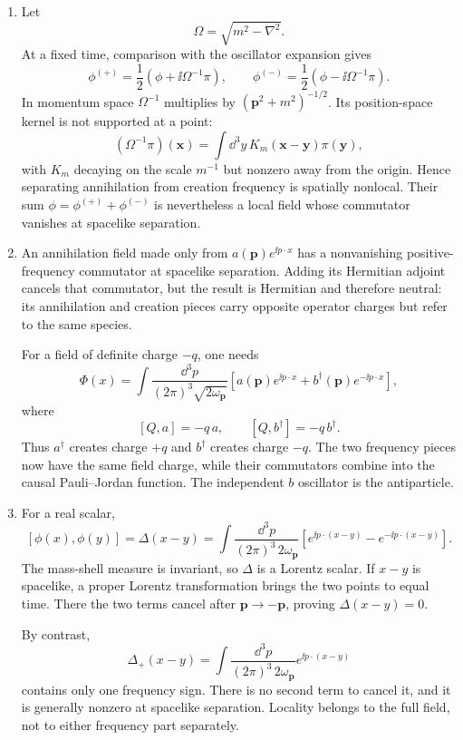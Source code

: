 \begin{enumerate}
\begin{enumerate}
\item
Let
\[
 \Omega=\sqrt{m^2-\nabla^2}.
\]
At a fixed time, comparison with the oscillator expansion gives
\[
 \phi^{(+)}=\frac12\left(\phi+\ii\Omega^{-1}\pi\right),\qquad
 \phi^{(-)}=\frac12\left(\phi-\ii\Omega^{-1}\pi\right).
\]
In momentum space \(\Omega^{-1}\) multiplies by
\((\mathbf p^2+m^2)^{-1/2}\).  Its position-space kernel is not supported at
a point:
\[
 (\Omega^{-1}\pi)(\mathbf x)
 =\int \dd^3y\,K_m(\mathbf x-\mathbf y)\pi(\mathbf y),
\]
with \(K_m\) decaying on the scale \(m^{-1}\) but nonzero away from the
origin.  Hence separating annihilation from creation frequency is spatially
nonlocal.  Their sum \(\phi=\phi^{(+)}+\phi^{(-)}\) is nevertheless a local
field whose commutator vanishes at spacelike separation.
\item
An annihilation field made only from \(a(\mathbf p)e^{\ii p\cdot x}\) has a
nonvanishing positive-frequency commutator at spacelike separation.  Adding
its Hermitian adjoint cancels that commutator, but the result is Hermitian and
therefore neutral: its annihilation and creation pieces carry opposite
operator charges but refer to the same species.

For a field of definite charge \(-q\), one needs
\[
 \Phi(x)=\int\frac{\dd^3p}{(2\pi)^3\sqrt{2\omega_{\mathbf p}}}
 \left[a(\mathbf p)e^{\ii p\cdot x}
 +b^\dagger(\mathbf p)e^{-\ii p\cdot x}\right],
\]
where
\[
 [Q,a]=-q\,a,\qquad [Q,b^\dagger]=-q\,b^\dagger.
\]
Thus \(a^\dagger\) creates charge \(+q\) and \(b^\dagger\) creates charge
\(-q\).  The two frequency pieces now have the same field charge, while
their commutators combine into the causal Pauli--Jordan function.  The
independent \(b\) oscillator is the antiparticle.
\item
For a real scalar,
\[
 [\phi(x),\phi(y)]
 =\Delta(x-y)
 =\int\frac{\dd^3p}{(2\pi)^3\,2\omega_{\mathbf p}}
 \left[e^{\ii p\cdot(x-y)}-e^{-\ii p\cdot(x-y)}\right].
\]
The mass-shell measure is invariant, so \(\Delta\) is a Lorentz scalar.
If \(x-y\) is spacelike, a proper Lorentz transformation brings the two
points to equal time.  There the two terms cancel after
\(\mathbf p\to-\mathbf p\), proving \(\Delta(x-y)=0\).

By contrast,
\[
 \Delta_+(x-y)=\int\frac{\dd^3p}{(2\pi)^3\,2\omega_{\mathbf p}}
 e^{\ii p\cdot(x-y)}
\]
contains only one frequency sign.  There is no second term to cancel it, and
it is generally nonzero at spacelike separation.  Locality belongs to the
full field, not to either frequency part separately.
\end{enumerate}


\end{enumerate}
